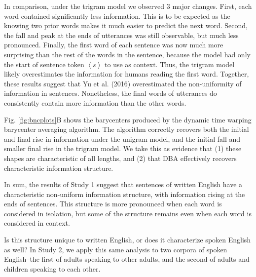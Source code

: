 \documentclass[
  english,
  man,floatsintext]{apa6}
\begin{document}
In comparison, under the trigram model we observed 3 major changes. First, each word contained significantly less information. This is to be expected as the knowing two prior words makes it much easier to predict the next word. Second, the fall and peak at the ends of utterances was still observable, but much less pronounced. Finally, the first word of each sentence was now much more surprising than the rest of the words in the sentence, because the model had only the start of sentence token \(\left<s\right>\) to use as context. Thus, the trigram model likely overestimates the information for humans reading the first word. Together, these results suggest that Yu et al. (2016) overestimated the non-uniformity of information in sentences. Nonetheless, the final words of utterances do consistently contain more information than the other words.

Fig. \ref{fig:bncplots}B shows the barycenters produced by the dynamic time warping barycenter averaging algorithm. The algorithm correctly recovers both the initial and final rise in information under the unigram model, and the initial fall and smaller final rise in the trigram model. We take this as evidence that (1) these shapes are characteristic of all lengths, and (2) that DBA effectively recovers characteristic information structure.

In sum, the results of Study 1 suggest that sentences of written English have a characteristic non-uniform information structure, with information rising at the ends of sentences. This structure is more pronounced when each word is considered in isolation, but some of the structure remains even when each word is considered in context.

Is this structure unique to written English, or does it characterize spoken English as well? In Study 2, we apply this same analysis to two corpora of spoken English--the first of adults speaking to other adults, and the second of adults and children speaking to each other.
\end{document}
